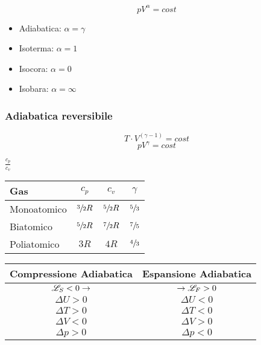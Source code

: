 \[
pV^\alpha = cost
\]

\begin{itemize}
    \item Adiabatica: $\alpha = \gamma $
    \item Isoterma: $\alpha = 1$
    \item Isocora: $\alpha = 0$
    \item Isobara: $\alpha = \infty$
\end{itemize}

\subsubsection{Adiabatica reversibile}
\begin{equation}
    T \cdot V ^{(\gamma - 1)} = cost
\end{equation}
\begin{equation}
    p V ^{\gamma} = cost
\end{equation}

\Def{$\gamma$} $\frac{c_p}{c_v}$
\begin{center}
\begin{tabular}{| l | c | c | c |}
    \hline
    \textbf{Gas} & \textbf{$c_p$} & \textbf{$c_v$} & \textbf{$\gamma$} \\
    \hline
    Monoatomico & $\sfrac{3}{2} R$ & $\sfrac{5}{2} R$ & $\sfrac{5}{3}$\\
    Biatomico & $\sfrac{5}{2} R$ & $\sfrac{7}{2} R$ & $\sfrac{7}{5}$\\
    Poliatomico & $3 R$ & $4 R$ & $\sfrac{4}{3}$\\
    \hline
\end{tabular}
\end{center}

\begin{center}
\begin{tabular}{| c | c |}
    \hline
    \textbf{Compressione Adiabatica} & \textbf{Espansione Adiabatica} \\
    \hline
    $\mathscr{L}_S < 0 \to$ & $ \to \mathscr{L}_F > 0$ \\
    \hline
    $\Delta U > 0$ & $\Delta U < 0$\\
    $\Delta T > 0$ & $\Delta T < 0$\\
    $\Delta V < 0$ & $\Delta V > 0$\\
    $\Delta p > 0$ & $\Delta p < 0$\\
    \hline
\end{tabular}
\end{center}

